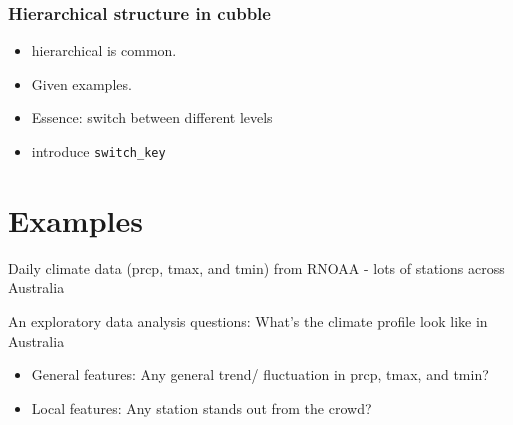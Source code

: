 \documentclass[
]{jss}
\providecommand{\tightlist}{%
  \setlength{\itemsep}{0pt}\setlength{\parskip}{0pt}}
\begin{document}
\hypertarget{hierarchical-structure-in-cubble}{%
\subsubsection{Hierarchical structure in
cubble}\label{hierarchical-structure-in-cubble}}

\begin{itemize}
\tightlist
\item
  hierarchical is common.
\item
  Given examples.
\item
  Essence: switch between different levels
\item
  introduce \texttt{switch\_key}
\end{itemize}

\hypertarget{examples-1}{%
\section{Examples}\label{examples-1}}

Daily climate data (prcp, tmax, and tmin) from RNOAA - lots of stations
across Australia

An exploratory data analysis questions: What's the climate profile look
like in Australia

\begin{itemize}
\tightlist
\item
  General features: Any general trend/ fluctuation in prcp, tmax, and
  tmin?
\item
  Local features: Any station stands out from the crowd?
\end{itemize}


\end{document}
